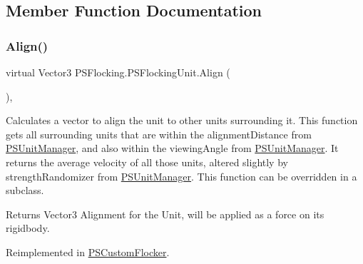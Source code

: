 \subsection{Member Function Documentation}
\mbox{\label{class_p_s_flocking_1_1_p_s_flocking_unit_ada3fa9e23f12a1b8258dc324f5b3e511}} 
\subsubsection{\texorpdfstring{Align()}{Align()}}
{\footnotesize\ttfamily virtual Vector3 P\+S\+Flocking.\+P\+S\+Flocking\+Unit.\+Align (\begin{DoxyParamCaption}{ }\end{DoxyParamCaption})\hspace{0.3cm}{\ttfamily [protected]}, {\ttfamily [virtual]}}



Calculates a vector to align the unit to other units surrounding it. This function gets all surrounding units that are within the alignment\+Distance from \hyperlink{class_p_s_flocking_1_1_p_s_unit_manager}{P\+S\+Unit\+Manager}, and also within the viewing\+Angle from \hyperlink{class_p_s_flocking_1_1_p_s_unit_manager}{P\+S\+Unit\+Manager}. It returns the average velocity of all those units, altered slightly by strength\+Randomizer from \hyperlink{class_p_s_flocking_1_1_p_s_unit_manager}{P\+S\+Unit\+Manager}. This function can be overridden in a subclass. 

\begin{DoxyReturn}{Returns}
Vector3 Alignment for the Unit, will be applied as a force on its rigidbody. 
\end{DoxyReturn}


Reimplemented in \hyperlink{class_p_s_custom_flocker_a50d8ac4146196420bcf1181289a27e40}{P\+S\+Custom\+Flocker}.

\mbox{\label{class_p_s_flocking_1_1_p_s_flocking_unit_a87ad210603e8d8451e14a4de8af9cba0}} 
